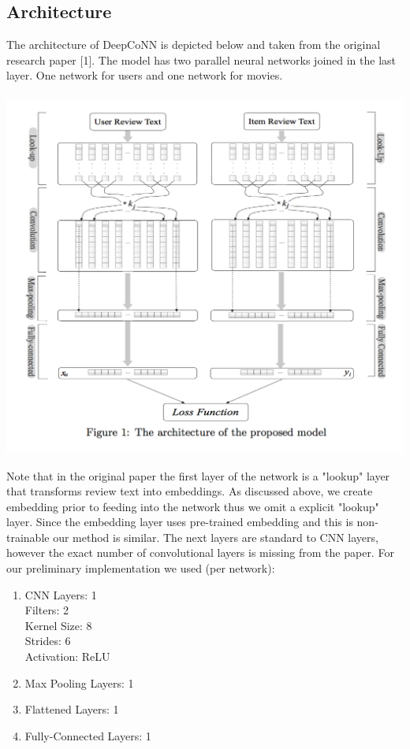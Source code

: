 \documentclass[10pt,twocolumn,letterpaper]{article}
\begin{document}
\subsection{Architecture}
The architecture of DeepCoNN is depicted below and taken from the original research paper [1]. The model has two parallel neural networks joined in the last layer. One network for
users and one network for movies.\\
\ \newline
\includegraphics[scale=0.38]{DeepCoNN}

Note that in the original paper the first layer of the network is a "lookup" layer that transforms review text into embeddings. As discussed above, we create embedding prior to feeding into the network thus we omit a explicit "lookup" layer. Since the embedding layer uses pre-trained embedding and this is non-trainable our method is similar. The next layers are standard to CNN layers, however the exact number of convolutional layers is missing from the paper. For our preliminary implementation we used (per network): \\

\begin{enumerate}
\item CNN Layers: 1 \\
    \hspace*{5mm} Filters: 2 \\
    \hspace*{5mm} Kernel Size: 8 \\
    \hspace*{5mm} Strides: 6 \\
    \hspace*{5mm} Activation: ReLU 
\item Max Pooling Layers: 1
\item Flattened Layers: 1
\item Fully-Connected Layers: 1
\end{enumerate}
\end{document}
